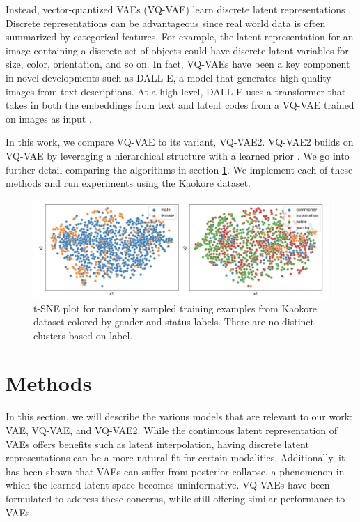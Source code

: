 \documentclass{article}
\begin{document}
Instead, vector-quantized VAEs (VQ-VAE) learn discrete latent representations \cite{VQ_VAE}. Discrete representations can be advantageous since real world data is often summarized by categorical features. For example, the latent representation for an image containing a discrete set of objects could have discrete latent variables for size, color, orientation, and so on. In fact, VQ-VAEs have been a key component in novel developments such as DALL-E, a model that generates high quality images from text descriptions. At a high level, DALL-E uses a transformer that takes in both the embeddings from text and latent codes from a VQ-VAE trained on images as input \cite{DALLE}.

In this work, we compare VQ-VAE to its variant, VQ-VAE2. VQ-VAE2 builds on VQ-VAE by leveraging a hierarchical structure with a learned prior \cite{VQ_VAE2}. We go into further detail comparing the algorithms in section \ref{methods}. We implement each of these methods and run experiments using the Kaokore dataset. 

\begin{figure}
    \centering
    \includegraphics[width=0.7\linewidth]{clustering.png}
    \caption{t-SNE plot for randomly sampled training examples from Kaokore dataset colored by gender and status labels. There are no distinct clusters based on label.}
    \label{fig:clustering}
\end{figure} 

\section{Methods} \label{methods}

In this section, we will describe the various models that are relevant to our work: VAE, VQ-VAE, and VQ-VAE2. While the continuous latent representation of VAEs offers benefits such as latent interpolation, having discrete latent representations can be a more natural fit for certain modalities. Additionally, it has been shown that VAEs can suffer from posterior collapse, a phenomenon in which the learned latent space becomes uninformative. VQ-VAEs have been formulated to address these concerns, while still offering similar performance to VAEs. 
\end{document}
